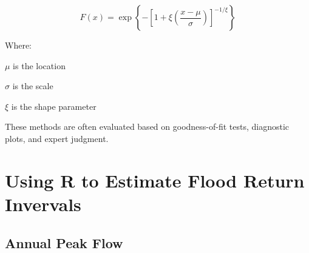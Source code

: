 \documentclass{tufte-handout}\usepackage[]{graphicx}\usepackage[]{xcolor}
\newenvironment{itemize*}%
  {\begin{itemize}%
    \setlength{\itemsep}{0pt}%
    \setlength{\parskip}{0pt}}%
  {\end{itemize}}
\begin{document}
\[
F(x) = \exp\left\{ -\left[ 1 + \xi \left(\frac{x - \mu}{\sigma} \right) \right]^{-1/\xi} \right\}
\]

Where:
\begin{itemize*}
  \item \( \mu \) is the location
  \item \( \sigma \) is the scale
  \item \( \xi \) is the shape parameter
\end{itemize*}


These methods are often evaluated based on goodness-of-fit tests, diagnostic plots, and expert judgment.

\section{Using R to Estimate Flood Return Invervals}

\subsection{Annual Peak Flow}
\end{document}
